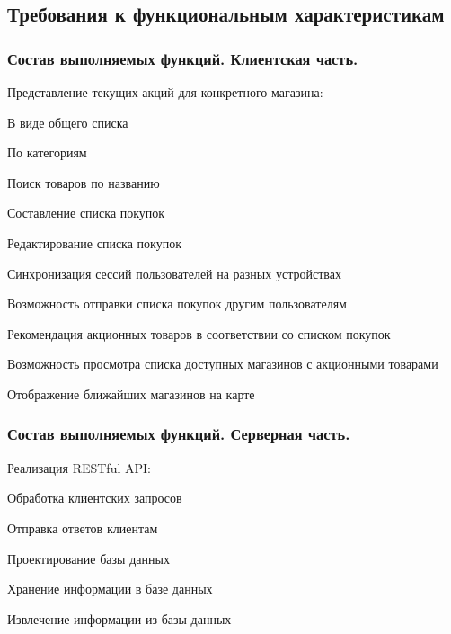 \subsection{Требования к функциональным характеристикам}

\subsubsection{Состав выполняемых функций. Клиентская часть.}
\begin{my_enumerate}
\item Представление текущих акций для конкретного магазина:
    \begin{my_enumerate}
    \item В виде общего списка
    \item По категориям
    \end{my_enumerate}
\item Поиск товаров по названию
\item Составление списка покупок
\item Редактирование списка покупок
\item Синхронизация сессий пользователей на разных устройствах
\item Возможность отправки списка покупок другим пользователям
\item Рекомендация акционных товаров в соответствии со списком покупок
\item Возможность просмотра списка доступных магазинов с акционными товарами
\item Отображение ближайших магазинов на карте
\end{my_enumerate}

\subsubsection{Состав выполняемых функций. Серверная часть.}
\begin{my_enumerate}
  \item 
  Реализация RESTful API:
  \begin{my_enumerate}
    \item Обработка клиентских запросов
    \item Отправка ответов клиентам
  \end{my_enumerate}
  \item Проектирование базы данных
  \begin{my_enumerate}
    \item Хранение информации в базе данных 
    \item Извлечение информации из базы данных
  \end{my_enumerate}
\end{my_enumerate}

